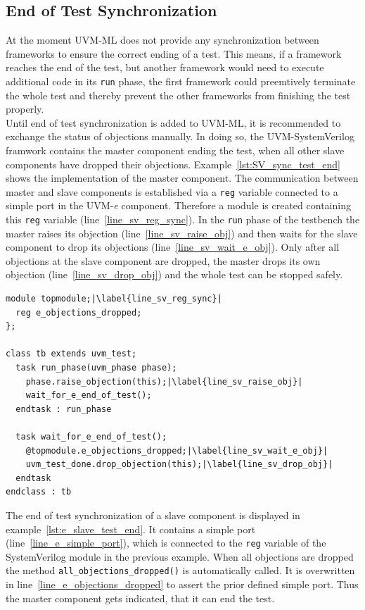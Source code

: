 \subsection{End of Test Synchronization}
At the moment UVM-ML does not provide any synchronization between frameworks to ensure the correct ending of a test. This means, if a framework reaches the end of the test, but another framework would need to execute additional code in its \lstinline$run$ phase, the first framework could preemtively terminate the whole test and thereby prevent the other frameworks from finishing the test properly.\\
Until end of test synchronization is added to UVM-ML, it is recommended to exchange the status of objections manually. In doing so, the UVM-SystemVerilog framwork contains the master component ending the test, when all other slave components have dropped their objections. Example~\ref{lst:SV_sync_test_end} shows the implementation of the master component. The communication between master and slave components is established via a \lstinline$reg$ variable connected to a simple port in the UVM-\textit{e} component. Therefore a module is created containing this \lstinline$reg$ variable (line~\ref{line_sv_reg_sync}). In the \lstinline$run$ phase of the testbench the master raises its objection (line~\ref{line_sv_raise_obj}) and then waits for the slave component to drop its objections (line~\ref{line_sv_wait_e_obj}). Only after all objections at the slave component are dropped, the master drops its own objection (line~\ref{line_sv_drop_obj}) and the whole test can be stopped safely.
\lstset{language=SystemVerilog, numbers = left, escapechar=|, breaklines=true}
\begin{lstlisting}[frame=htrbl, caption={SystemVerilog: ending the test when UVM-\textit{e} components are ready},
label={lst:SV_sync_test_end}]
module topmodule;|\label{line_sv_reg_sync}|
  reg e_objections_dropped;
};

class tb extends uvm_test;
  task run_phase(uvm_phase phase);
    phase.raise_objection(this);|\label{line_sv_raise_obj}|
    wait_for_e_end_of_test();
  endtask : run_phase
  
  task wait_for_e_end_of_test();
    @topmodule.e_objections_dropped;|\label{line_sv_wait_e_obj}|
    uvm_test_done.drop_objection(this);|\label{line_sv_drop_obj}|
  endtask
endclass : tb
\end{lstlisting}
The end of test synchronization of a slave component is displayed in example~\ref{lst:e_slave_test_end}. It contains a simple port (line~\ref{line_e_simple_port}), which is connected to the \lstinline$reg$ variable of the SystemVerilog module in the previous example. When all objections are dropped the method \lstinline$all_objections_dropped()$ is automatically called. It is overwritten in line~\ref{line_e_objections_dropped} to assert the prior defined simple port. Thus the master component gets indicated, that it can end the test.
